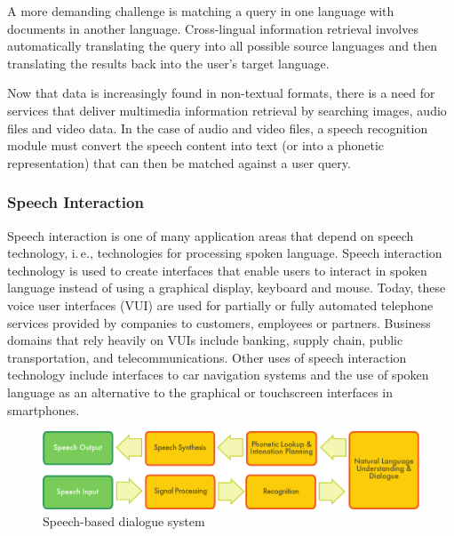 \begin{multicols}{2}

A more demanding challenge is matching a query in one language with documents in another language. Cross-lingual information retrieval involves automatically translating the query into all possible source languages and then translating the results back into the user's target language.

Now that data is increasingly found in non-textual formats, there is a need for services that deliver multimedia information retrieval by searching images, audio files and video data. In the case of audio and video files, a speech recognition module must convert the speech content into text (or into a phonetic representation) that can then be matched against a user query.

\subsubsection{Speech Interaction}

Speech interaction is one of many application areas that depend on speech technology, i.\,e., technologies for processing spoken language. Speech interaction technology is used to create interfaces that enable users to interact in spoken language instead of using a graphical display, keyboard and mouse.  Today, these voice user interfaces (VUI) are used for partially or fully automated telephone services provided by companies to customers, employees or partners. Business domains that rely heavily on VUIs include banking, supply chain, public transportation, and telecommunications. Other uses of speech interaction technology include interfaces to car navigation systems and the use of spoken language as an alternative to the graphical or touchscreen interfaces in smartphones.

\begin{figure}[htb]
  \center
  \includegraphics[width=\textwidth]{../_media/english/simple_speech-based_dialogue_architecture}
  \caption{Speech-based dialogue system}
\label{fig:dialoguearch_en}
\end{figure}


\end{multicols}
